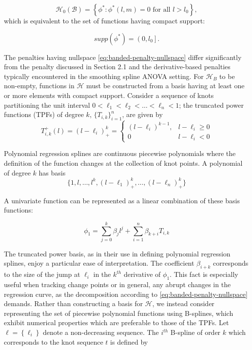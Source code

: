 \documentclass[12pt]{article}
\theoremstyle{definition}
\begin{document}
\begin{equation} \label{eq:banded-penalty-nullspace}
\mathcal{H}_0\left(\mathcal{B}\right) = \left\{ \phi^*: \phi^*\left(l,m\right) = 0 \mbox{ for all } l > l_0 \right\},
\end{equation}
\noindent
which is equivalent to the set of functions having compact support:

\[
supp\left( \phi^* \right) = \left(0,l_0\right].
\]


The penalties having nullspace \ref{eq:banded-penalty-nullspace} differ significantly from the penalty discussed in Section 2.1 and the derivative-based penalties typically encountered in the smoothing spline ANOVA setting. For $\mathcal{H}_B$ to be non-empty, functions in $\mathcal{H}$ must be constructed from a basis having at least one or more elements with compact support. Consider a sequence of knots partitioning the unit interval $0 < \ell_1 < \ell_2 < \dots < \ell_n < 1$; the truncated power functions (TPFs) of degree $k$, $\lbrace T_{i,k} \rbrace_{i=1}^n$, are given by
\begin{equation*}
T^+_{i,k}\left(l\right) = \left(l - \ell_i\right)^{k}_+ = \left\{\begin{array}{lr} \left(l-\ell_i\right)^{k-1}, & l-\ell_i \ge0\\ 0 & l-\ell_i < 0\end{array}\right.
\end{equation*}

Polynomial regression splines are continuous piecewise polynomials where the definition of the function changes at the collection of knot points. A polynomial of degree $k$ has basis
\[
\lbrace 1,l,\dots,l^k, \left(l - \ell_1\right)^{k}_+,\dots, \left(l - \ell_n\right)^{k}_+ \rbrace
\]

A univariate function can be represented as a linear combination of these basis functions: 

\[
\phi_1 = \sum_{j=0}^k \beta_j l^j + \sum_{i=1}^n \beta_{k+i} T_{i,k}
\]
\noindent

The truncated power basis, as in their use in defining polynomial regression splines, enjoy a particular ease of interpretation. The coefficient $\beta_{i+k}$ corresponds to the size of the jump at $\ell_i$ in the $k^{th}$ derivative of $\phi_1$. This fact is especially useful when tracking change points or in general, any abrupt changes in the regression curve, as the decomposition according to \ref{eq:banded-penalty-nullspace} demands. Rather than constructing a basis for $\mathcal{H}$, we instead consider representing the set of piecewise polynomial functions using B-splines, which exhibit numerical properties which are preferable to those of the TPFs. Let $\ell= \left\{ \ell_i \right\}$ denote a non-decreasing sequence. The $i^{th}$ B-spline of order $k$ which corresponds to the knot sequence $t$ is defined by 
\end{document}
